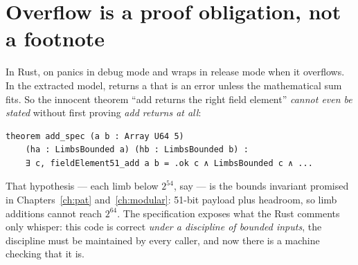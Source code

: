 \section{Overflow is a proof obligation, not a footnote}

In Rust,  on  panics in debug mode and wraps in
release mode when it overflows. In the extracted model, 
returns a  that is an error unless the mathematical sum fits.
So the innocent theorem ``add returns the right field element'' \emph{cannot
even be stated} without first proving \emph{add returns at all}:

\begin{lstlisting}[language=Lean]
theorem add_spec (a b : Array U64 5)
    (ha : LimbsBounded a) (hb : LimbsBounded b) :
    ∃ c, fieldElement51_add a b = .ok c ∧ LimbsBounded c ∧ ...
\end{lstlisting}

That hypothesis  --- each limb below $2^{54}$, say --- is
the bounds invariant promised in Chapters~\ref{ch:pat}
and~\ref{ch:modular}: 51-bit payload plus headroom, so limb additions cannot
reach $2^{64}$. The specification exposes what the Rust comments only
whisper: this code is correct \emph{under a discipline of bounded inputs},
the discipline must be maintained by every caller, and now there is a
machine checking that it is.

